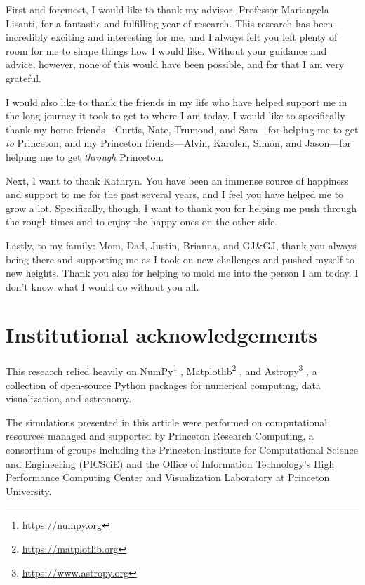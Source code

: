 \documentclass[12pt,oneside]{book}
\begin{document}
First and foremost, I would like to thank my advisor, Professor Mariangela
Lisanti, for a fantastic and fulfilling year of research.  This research has
been incredibly exciting and interesting for me, and I always felt you left
plenty of room for me to shape things how I would like.  Without your guidance
and advice, however, none of this would have been possible, and for that I am
very grateful.

I would also like to thank the friends in my life who have helped support me
in the long journey it took to get to where I am today.  I would like to
specifically thank my home friends---Curtis, Nate, Trumond, and Sara---for
helping me to get \textit{to} Princeton, and my Princeton friends---Alvin,
Karolen, Simon, and Jason---for helping me to get \textit{through} Princeton.

Next, I want to thank Kathryn.  You have been an immense source of happiness
and support to me for the past several years, and I feel you have helped me to
grow a lot.  Specifically, though, I want to thank you for helping me push
through the rough times and to enjoy the happy ones on the other side.

Lastly, to my family: Mom, Dad, Justin, Brianna, and GJ\&GJ, thank you always
being there and supporting me as I took on new challenges and pushed myself to
new heights.  Thank you also for helping to mold me into the person I am
today.  I don't know what I would do without you all.

\chapter{Institutional acknowledgements}

This research relied heavily on NumPy\footnote{\url{https://numpy.org}}
\cite{harris_array_2020}, Matplotlib\footnote{\url{https://matplotlib.org}}
\cite{hunter_matplotlib_2007}, and Astropy\footnote{\url{https://www.astropy.org}}
\cite{astropy_collaboration_astropy_2013, astropy_collaboration_astropy_2018},
a collection of open-source Python packages for numerical computing, data
visualization, and astronomy.

The simulations presented in this article were performed on computational resources managed and supported by Princeton Research Computing, a consortium of groups including the Princeton Institute for Computational Science and Engineering (PICSciE) and the Office of Information Technology's High Performance Computing Center and Visualization Laboratory at Princeton University.

\printbibliography
\end{document}
